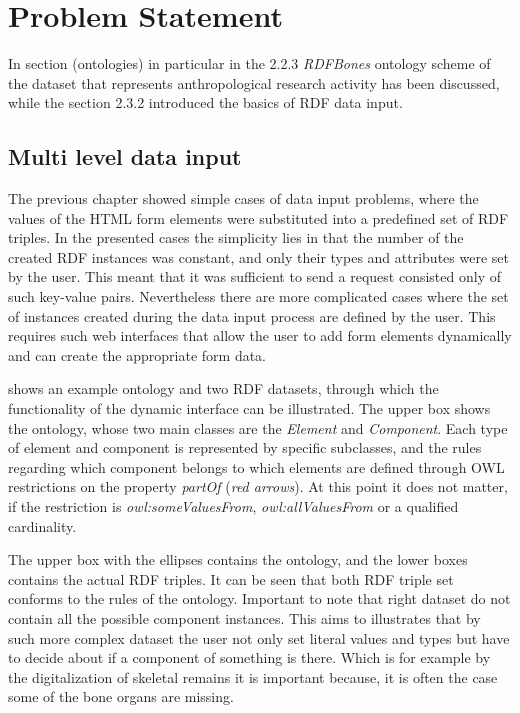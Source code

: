 \chapter{Problem Statement}


In section (ontologies) in particular in the 2.2.3 \textit{RDFBones} ontology scheme of the dataset that represents anthropological research activity has been discussed, while the section 2.3.2 introduced the basics of RDF data input. 


\section{Multi level data input}


The previous chapter showed simple cases of data input problems, where the values of the HTML form elements were substituted into a predefined set of RDF triples. In the presented cases the simplicity lies in that the number of the created RDF instances was constant, and only their types and attributes were set by the user. This meant that it was sufficient to send a request consisted only of such key-value pairs. Nevertheless there are more complicated cases where the set of instances created during the data input process are defined by the user. This requires such web interfaces that allow the user to add form elements dynamically and can create the appropriate form data.

 shows an example ontology and two RDF datasets, through which the functionality of the dynamic interface can be illustrated. The upper box shows the ontology, whose two main classes are the \textit{Element} and \textit{Component}. Each type of element and component is represented by specific subclasses, and the rules regarding which component belongs to which elements are defined through OWL restrictions on the property \textit{partOf} (\textit{red arrows}). At this point it does not matter, if the restriction is \textit{owl:someValuesFrom}, \textit{owl:allValuesFrom} or a qualified cardinality. 


The upper box with the ellipses contains the ontology, and the lower boxes contains the actual RDF triples. It can be seen that both RDF triple set conforms to the rules of the ontology. Important to note that right dataset do not contain all the possible component instances. This aims to illustrates that by such more complex dataset the user not only set literal values and types but have to decide about if a component of something is there. Which is for example by the digitalization of skeletal remains it is important because, it is often the case some of the bone organs are missing. 


